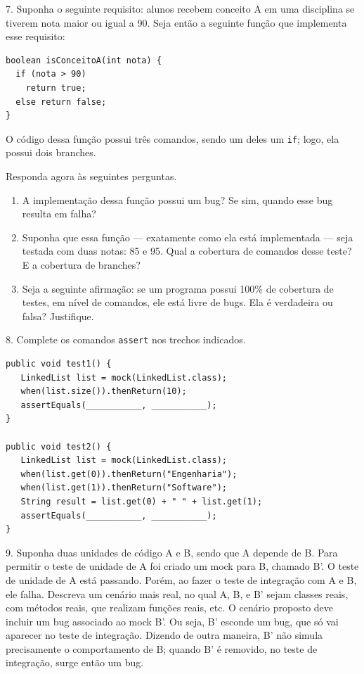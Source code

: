 \documentclass[
  11pt,
  twoside]{book}
\newcommand{\passthrough}[1]{#1}
\begin{document}
7. Suponha o seguinte requisito: alunos recebem conceito A em uma
disciplina se tiverem nota maior ou igual a 90. Seja então a seguinte
função que implementa esse requisito:

\begin{lstlisting}
boolean isConceitoA(int nota) {
  if (nota > 90)
    return true;
  else return false;
}
\end{lstlisting}

O código dessa função possui três comandos, sendo um deles um
\passthrough{\lstinline!if!}; logo, ela possui dois branches.

Responda agora às seguintes perguntas.

\begin{enumerate}
\def\labelenumi{(\alph{enumi})}
\item
  A implementação dessa função possui um bug? Se sim, quando esse bug
  resulta em falha?
\item
  Suponha que essa função --- exatamente como ela está implementada ---
  seja testada com duas notas: 85 e 95. Qual a cobertura de comandos
  desse teste? E a cobertura de branches?
\item
  Seja a seguinte afirmação: se um programa possui 100\% de cobertura de
  testes, em nível de comandos, ele está livre de bugs. Ela é verdadeira
  ou falsa? Justifique.
\end{enumerate}

8. Complete os comandos \passthrough{\lstinline!assert!} nos trechos
indicados.

\begin{lstlisting}
public void test1() {
   LinkedList list = mock(LinkedList.class);
   when(list.size()).thenReturn(10);
   assertEquals(___________, ___________);
}

public void test2() {
   LinkedList list = mock(LinkedList.class);
   when(list.get(0)).thenReturn("Engenharia");
   when(list.get(1)).thenReturn("Software");
   String result = list.get(0) + " " + list.get(1);
   assertEquals(___________, ___________);
}
\end{lstlisting}

9. Suponha duas unidades de código A e B, sendo que A depende de B. Para
permitir o teste de unidade de A foi criado um mock para B, chamado B'.
O teste de unidade de A está passando. Porém, ao fazer o teste de
integração com A e B, ele falha. Descreva um cenário mais real, no qual
A, B, e B' sejam classes reais, com métodos reais, que realizam funções
reais, etc. O cenário proposto deve incluir um bug associado ao mock B'.
Ou seja, B' esconde um bug, que só vai aparecer no teste de integração.
Dizendo de outra maneira, B' não simula precisamente o comportamento de
B; quando B' é removido, no teste de integração, surge então um bug.
\end{document}
